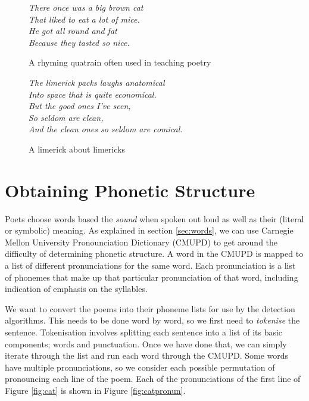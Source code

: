 \begin{figure}
\centering
\begin{minipage}{0.45\textwidth}
\centering
\textit{
There once was a big brown cat\\
That liked to eat a lot of mice.\\
He got all round and fat\\
Because they tasted so nice.
}
\caption{A rhyming quatrain often used in teaching poetry}
\label{fig:cat}
\end{minipage}\hfill
\begin{minipage}{0.45\textwidth}
\centering
\textit{
The limerick packs laughs anatomical\\
Into space that is quite economical.\\
    But the good ones I've seen,\\
    So seldom are clean,\\
And the clean ones so seldom are comical.
}
\caption{A limerick about limericks}
\label{fig:limerick}
\end{minipage}
\end{figure}


\section{Obtaining Phonetic Structure}

Poets choose words based the \textit{sound} when spoken out loud as well as their (literal or symbolic) meaning. As explained in section \ref{sec:words}, we can use Carnegie Mellon University Pronounciation Dictionary (CMUPD) to get around the difficulty of determining phonetic structure. A word in the CMUPD is mapped to a list of different pronunciations for the same word. Each pronunciation is a list of phonemes that make up that particular pronunciation of that word, including indication of emphasis on the syllables.

We want to convert the poems into their phoneme lists for use by the detection algorithms. This needs to be done word by word, so we first need to \textit{tokenise} the sentence. Tokenisation involves splitting each sentence into a list of its basic components; words and punctuation. Once we have done that, we can simply iterate through the list and run each word through the CMUPD. Some words have multiple pronunciations, so we consider each possible permutation of pronouncing each line of the poem. Each of the pronunciations of the first line of Figure \ref{fig:cat} is shown in Figure \ref{fig:catpronun}.

